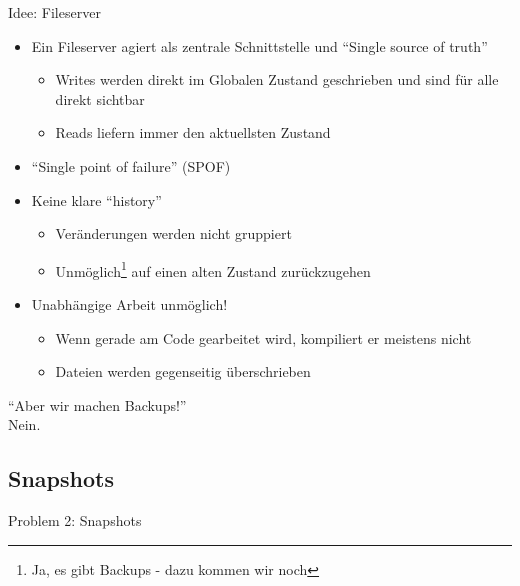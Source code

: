 \begin{frame}
    \slidehead
    \vspace{-1em}
    Idee: Fileserver
    \begin{itemize}
        [<+->]
        \item Ein Fileserver agiert als zentrale Schnittstelle und \enquote{Single source of truth}
            \begin{itemize}
                \item Writes werden direkt im Globalen Zustand geschrieben und sind für alle direkt sichtbar
                \item Reads liefern immer den aktuellsten Zustand
            \end{itemize}
        \item \enquote{Single point of failure} (SPOF)
        \item Keine klare \enquote{history}
            \begin{itemize}
                \item Veränderungen werden nicht gruppiert
                \item Unmöglich\footnote{Ja, es gibt Backups - dazu kommen wir noch} auf einen alten Zustand zurückzugehen
            \end{itemize}
        \item Unabhängige Arbeit unmöglich!
            \begin{itemize}
                \item Wenn gerade am Code gearbeitet wird, kompiliert er meistens nicht
                \item Dateien werden gegenseitig überschrieben
            \end{itemize}
    \end{itemize}
\end{frame}

\begin{frame}[c]
    \slidehead
    \Large
    \centering
    \enquote{Aber wir machen Backups!}
    \pause
    \\
    \vspace{1em}
    \textcolor{red!90}{Nein.}
\end{frame}

\subsection{Snapshots}\label{subsec:snapshots}

\begin{frame}[c]
    \slidehead
    \centering
    \Large
    Problem 2: Snapshots
\end{frame}

